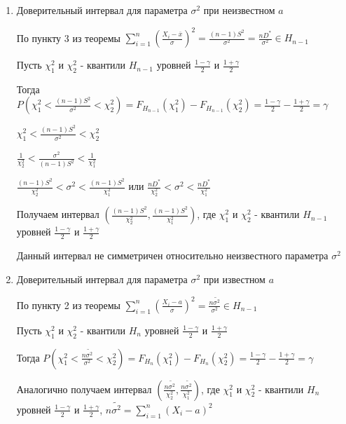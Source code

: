 \documentclass[12pt]{article}
\begin{document}
\begin{enumerate}[label*=\Roman*.]
    \hypertarget{confidence_interval_for_sigma_unknown_a}{}

    \item Доверительный интервал для параметра $\sigma^2$ при неизвестном $a$

    По пункту 3 из теоремы $\sum_{i = 1}^n \left(\frac{X_i - \overline{x}}{\sigma}\right)^2 = \frac{(n - 1)S^2}{\sigma^2} = 
    \frac{nD^*}{\sigma^2} \in H_{n - 1}$

    Пусть $\chi_1^2$ и $\chi_2^2$ - квантили $H_{n - 1}$ уровней $\frac{1 - \gamma}{2}$ и $\frac{1 + \gamma}{2}$

    Тогда $P\left(\chi_1^2 < \frac{(n - 1)S^2}{\sigma^2} < \chi_2^2\right) = F_{H_{n - 1}}(\chi_1^2) - F_{H_{n - 1}}(\chi_2^2) = \frac{1 - \gamma}{2} - \frac{1 + \gamma}{2} = \gamma$

    $\chi_1^2 < \frac{(n - 1)S^2}{\sigma^2} < \chi_2^2$

    $\frac{1}{\chi_2^2} < \frac{\sigma^2}{(n - 1)S^2} < \frac{1}{\chi_1^2}$

    $\frac{(n - 1)S^2}{\chi_2^2} < \sigma^2 < \frac{(n - 1)S^2}{\chi_1^2}$ или 
    $\frac{nD^*}{\chi_2^2} < \sigma^2 < \frac{nD^*}{\chi_1^2}$

    Получаем интервал $\left(\frac{(n - 1)S^2}{\chi_2^2}, \frac{(n - 1)S^2}{\chi_1^2}\right)$, где $\chi_1^2$ и $\chi_2^2$ - квантили $H_{n - 1}$ уровней $\frac{1 - \gamma}{2}$ и $\frac{1 + \gamma}{2}$

    \Nota Данный интервал не симметричен относительно неизвестного параметра $\sigma^2$

    \hypertarget{confidence_interval_for_sigma_known_a}{}

    \item Доверительный интервал для параметра $\sigma^2$ при известном $a$

    По пункту 2 из теоремы $\sum_{i = 1}^n \left(\frac{X_i - a}{\sigma}\right)^2 = \frac{n \tilde{\sigma^2}}{\sigma^2} \in H_{n - 1}$
    
    Пусть $\chi_1^2$ и $\chi_2^2$ - квантили $H_{n}$ уровней $\frac{1 - \gamma}{2}$ и $\frac{1 + \gamma}{2}$

    Тогда $P\left(\chi_1^2 < \frac{n \tilde{\sigma^2}}{\sigma^2} < \chi_2^2\right) = F_{H_{n}}(\chi_1^2) - F_{H_{n}}(\chi_2^2) = \frac{1 - \gamma}{2} - \frac{1 + \gamma}{2} = \gamma$

    Аналогично получаем интервал $\left(\frac{n \tilde{\sigma^2}}{\chi_2^2}, \frac{n \tilde{\sigma^2}}{\chi_1^2}\right)$, 
    где $\chi_1^2$ и $\chi_2^2$ - квантили $H_{n}$ уровней $\frac{1 - \gamma}{2}$ и $\frac{1 + \gamma}{2}$, $n \tilde{\sigma^2} = \sum_{i = 1}^n (X_i - a)^2$


\end{enumerate}
\end{document}
